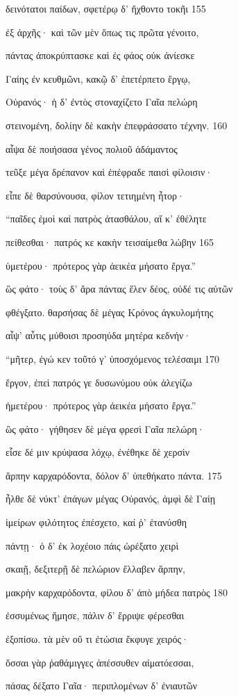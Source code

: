 δεινότατοι παίδων, σφετέρῳ δ' ἤχθοντο τοκῆι 155

ἐξ ἀρχῆς· καὶ τῶν μὲν ὅπως τις πρῶτα γένοιτο, 

πάντας ἀποκρύπτασκε καὶ ἐς φάος οὐκ ἀνίεσκε

Γαίης ἐν κευθμῶνι, κακῷ δ' ἐπετέρπετο ἔργῳ, 

Οὐρανός· ἡ δ' ἐντὸς στοναχίζετο Γαῖα πελώρη

στεινομένη, δολίην δὲ κακὴν ἐπεφράσσατο τέχνην. 160

αἶψα δὲ ποιήσασα γένος πολιοῦ ἀδάμαντος

τεῦξε μέγα δρέπανον καὶ ἐπέφραδε παισὶ φίλοισιν· 

εἶπε δὲ θαρσύνουσα, φίλον τετιημένη ἦτορ·

``παῖδες ἐμοὶ καὶ πατρὸς ἀτασθάλου, αἴ κ' ἐθέλητε

πείθεσθαι· πατρός κε κακὴν τεισαίμεθα λώβην 165

ὑμετέρου· πρότερος γὰρ ἀεικέα μήσατο ἔργα.'' 

ὣς φάτο· τοὺς δ' ἄρα πάντας ἕλεν δέος, οὐδέ τις αὐτῶν

φθέγξατο. θαρσήσας δὲ μέγας Κρόνος ἀγκυλομήτης

αἶψ' αὖτις μύθοισι προσηύδα μητέρα κεδνήν·

``μῆτερ, ἐγώ κεν τοῦτό γ' ὑποσχόμενος τελέσαιμι 170 

ἔργον, ἐπεὶ πατρός γε δυσωνύμου οὐκ ἀλεγίζω

ἡμετέρου· πρότερος γὰρ ἀεικέα μήσατο ἔργα.''

ὣς φάτο· γήθησεν δὲ μέγα φρεσὶ Γαῖα πελώρη· 

εἷσε δέ μιν κρύψασα λόχῳ, ἐνέθηκε δὲ χερσὶν 

ἅρπην καρχαρόδοντα, δόλον δ' ὑπεθήκατο πάντα. 175 

ἦλθε δὲ νύκτ' ἐπάγων μέγας Οὐρανός, ἀμφὶ δὲ Γαίῃ

ἱμείρων φιλότητος ἐπέσχετο, καί ῥ' ἐτανύσθη

πάντῃ· ὁ δ' ἐκ λοχέοιο πάις ὠρέξατο χειρὶ

σκαιῇ, δεξιτερῇ δὲ πελώριον ἔλλαβεν ἅρπην,

μακρὴν καρχαρόδοντα, φίλου δ' ἀπὸ μήδεα πατρὸς 180

ἐσσυμένως ἤμησε, πάλιν δ' ἔρριψε φέρεσθαι

ἐξοπίσω. τὰ μὲν οὔ τι ἐτώσια ἔκφυγε χειρός· 

ὅσσαι γὰρ ῥαθάμιγγες ἀπέσσυθεν αἱματόεσσαι,

πάσας δέξατο Γαῖα· περιπλομένων δ' ἐνιαυτῶν 

